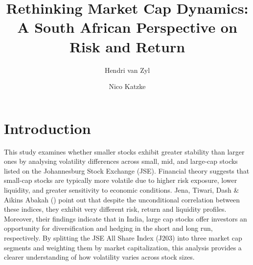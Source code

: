 \documentclass[12pt,preprint]{elsarticle}
\numberwithin{equation}{section}
\numberwithin{figure}{section}
\numberwithin{table}{section}
\begin{document}
\begin{frontmatter}  %

\title{Rethinking Market Cap Dynamics: A South African Perspective on
Risk and Return}





\author[Add1]{Hendri van Zyl}

\author[Add2]{Nico Katzke}




\address[Add1]{Stellenosch University, South Africa}
\address[Add2]{Satrix, Cape Town, South Africa}



\vspace{1cm}





\vspace{0.5cm}

\end{frontmatter}

\setcounter{footnote}{0}



\pagestyle{fancy}
\chead{}
\rhead{}
\lfoot{}
\lhead{}
\cfoot{}


\headsep 35pt %




\section{\texorpdfstring{Introduction
\label{Introduction}}{Introduction }}\label{introduction}

This study examines whether smaller stocks exhibit greater stability
than larger ones by analysing volatility differences across small, mid,
and large-cap stocks listed on the Johannesburg Stock Exchange (JSE).
Financial theory suggests that small-cap stocks are typically more
volatile due to higher risk exposure, lower liquidity, and greater
sensitivity to economic conditions. Jena, Tiwari, Dash \& Aikins Abakah
() point out that despite the
unconditional correlation between these indices, they exhibit very
different risk, return and liquidity profiles. Moreover, their findings
indicate that in India, large cap stocks offer investors an opportunity
for diversification and hedging in the short and long run, respectively.
By splitting the JSE All Share Index (J203) into three market cap
segments and weighting them by market capitalization, this analysis
provides a clearer understanding of how volatility varies across stock
sizes.
\end{document}
